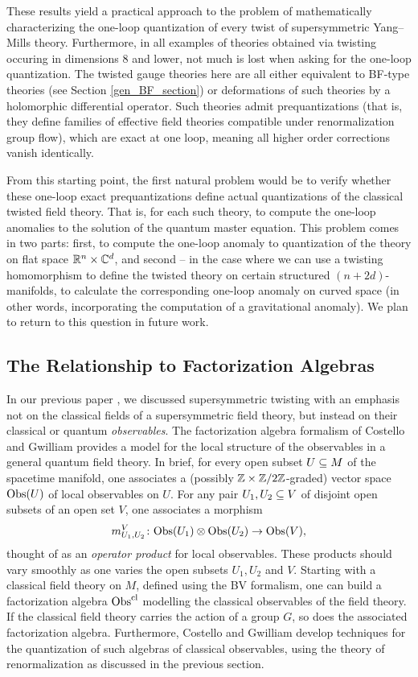 \documentclass[10pt, oneside]{article}
\begin{document}
These results yield a practical approach to the problem of mathematically characterizing the one-loop quantization of every twist of supersymmetric Yang--Mills theory. Furthermore, in all examples of theories obtained via twisting occuring in dimensions 8 and lower, not much is lost when asking for the one-loop quantization.  The twisted gauge theories here are all either equivalent to BF-type theories (see Section \ref{gen_BF_section}) or deformations of such theories by a holomorphic differential operator.  Such theories admit prequantizations (that is, they define families of effective field theories compatible under renormalization group flow), which are exact at one loop, meaning all higher order corrections vanish identically.  

From this starting point, the first natural problem would be to verify whether these one-loop exact prequantizations define actual quantizations of the classical twisted field theory.  That is, for each such theory, to compute the one-loop anomalies to the solution of the quantum master equation.  This problem comes in two parts: first, to compute the one-loop anomaly to quantization of the theory on flat space $\mathbb R^n \times \mathbb C^d$, and second -- in the case where we can use a twisting homomorphism to define the twisted theory on certain structured $(n+2d)$-manifolds, to calculate the corresponding one-loop anomaly on curved space (in other words, incorporating the computation of a gravitational anomaly). We plan to return to this question in future work.

\subsection*{The Relationship to Factorization Algebras}
In our previous paper \cite{ElliottSafronov}, we discussed supersymmetric twisting with an emphasis not on the classical fields of a supersymmetric field theory, but instead on their classical or quantum \emph{observables}.  The factorization algebra formalism of Costello and Gwilliam \cite{Book1, Book2} provides a model for the local structure of the observables in a general quantum field theory.  In brief, for every open subset $U \subseteq M$ of the spacetime manifold, one associates a (possibly $\mathbb Z \times \mathbb Z/2\mathbb Z$-graded) vector space $\mathrm{Obs}(U)$ of local observables on $U$.  For any pair $U_1, U_2 \subseteq V$ of disjoint open subsets of an open set $V$, one associates a morphism
\[m_{U_1, U_2}^V \colon \mathrm{Obs}(U_1) \otimes \mathrm{Obs}(U_2)\to \mathrm{Obs}(V),\]
thought of as an \emph{operator product} for local observables.  These products should vary smoothly as one varies the open subsets $U_1, U_2$ and $V$.  Starting with a classical field theory on $M$, defined using the BV formalism, one can build a factorization algebra $\mathrm{Obs}^{\mathrm{cl}}$ modelling the classical observables of the field theory.  If the classical field theory carries the action of a group $G$, so does the associated factorization algebra.  Furthermore, Costello and Gwilliam develop techniques for the quantization of such algebras of classical observables, using the theory of renormalization as discussed in the previous section.
\end{document}
